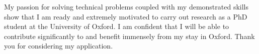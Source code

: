 \documentclass[12pt]{article}
\begin{document}
My passion for solving technical problems coupled with my demonstrated skills show that I am ready and extremely motivated to carry out research as a PhD student at the University of Oxford. I am confident that I will be able to contribute significantly to and benefit immensely from my stay in Oxford. Thank you for considering my application.



\end{document}
